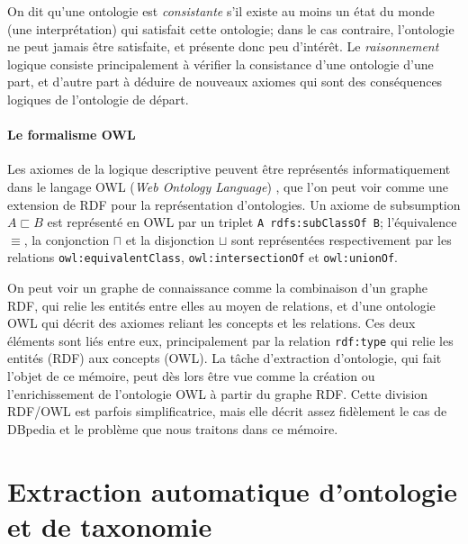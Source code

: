 On dit qu'une ontologie est \textit{consistante} s'il existe au moins un état du monde (une interprétation) qui satisfait cette ontologie; dans le cas contraire, l'ontologie ne peut jamais être satisfaite, et présente donc peu d'intérêt. Le \textit{raisonnement} logique consiste principalement à vérifier la consistance d'une ontologie d'une part, et d'autre part à déduire de nouveaux axiomes qui sont des conséquences logiques de l'ontologie de départ.


\paragraph{Le formalisme OWL}

Les axiomes de la logique descriptive peuvent être représentés informatiquement dans le langage OWL (\textit{Web Ontology Language}) \cite{Hitzler:12:OWO}, que l'on peut voir comme une extension de RDF pour la représentation d'ontologies. Un axiome de subsumption $A \sqsubset B$ est représenté en OWL par un triplet \texttt{A rdfs:subClassOf B}; l'équivalence $\equiv$, la conjonction $\sqcap$ et la disjonction $\sqcup$ sont représentées respectivement par les relations \texttt{owl:equivalentClass}, \texttt{owl:intersectionOf} et \texttt{owl:unionOf}. %

On peut voir un graphe de connaissance comme la combinaison d'un graphe RDF, qui relie les entités entre elles au moyen de relations, et d'une ontologie OWL qui décrit des axiomes reliant les concepts et les relations. Ces deux éléments sont liés entre eux, principalement par la relation \texttt{rdf:type} qui relie les entités (RDF) aux concepts (OWL). La tâche d'extraction d'ontologie, qui fait l'objet de ce mémoire, peut dès lors être vue comme la création ou l'enrichissement de l'ontologie OWL à partir du graphe RDF. Cette division RDF/OWL est parfois simplificatrice, mais elle décrit assez fidèlement le cas de DBpedia et le problème que nous traitons dans ce mémoire.


\section{Extraction automatique d'ontologie et de taxonomie}



